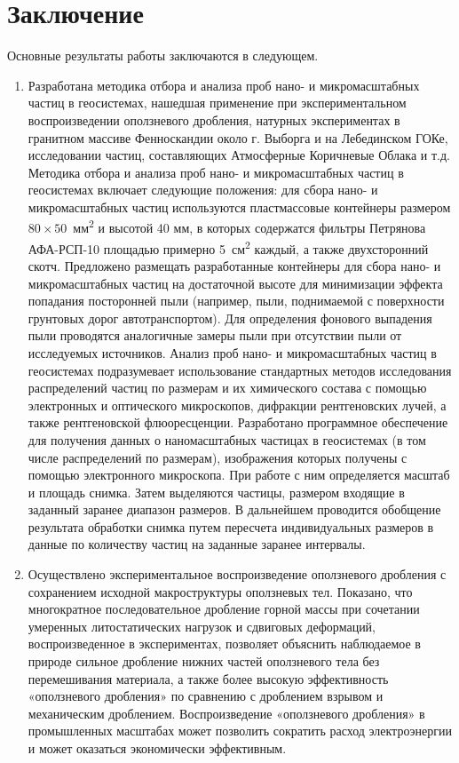 \chapter*{Заключение}						%

Основные результаты работы заключаются в следующем.
\begin{enumerate}
  \item Разработана методика отбора и анализа проб нано- и микромасштабных частиц в геосистемах, нашедшая применение при экспериментальном воспроизведении оползневого дробления,  натурных экспериментах в гранитном массиве Фенноскандии около г. Выборга и на Лебединском ГОКе, исследовании частиц, составляющих Атмосферные Коричневые Облака и т.д. Методика отбора и анализа проб нано- и микромасштабных частиц в геосистемах включает следующие положения: для сбора нано- и микромасштабных частиц  используются пластмассовые контейнеры размером $80\times50$~мм\textsuperscript{2} и высотой 40 мм, в которых содержатся фильтры Петрянова АФА-РСП-10 площадью примерно 5~см\textsuperscript{2} каждый, а также двухсторонний скотч. Предложено размещать разработанные контейнеры для сбора нано- и микромасштабных частиц на достаточной высоте для минимизации эффекта попадания посторонней пыли (например, пыли, поднимаемой с поверхности грунтовых дорог автотранспортом). Для определения фонового выпадения пыли проводятся аналогичные замеры пыли при отсутствии пыли от исследуемых источников. Анализ проб нано- и микромасштабных частиц в геосистемах подразумевает использование стандартных методов исследования распределений частиц по размерам и их химического состава с помощью электронных и оптического микроскопов, дифракции рентгеновских лучей, а также рентгеновской флюоресценции. Разработано программное обеспечение для получения данных о наномасштабных частицах в геосистемах (в том числе распределений по размерам), изображения которых получены с помощью электронного микроскопа. При работе с ним определяется масштаб и площадь снимка. Затем выделяются частицы, размером входящие в заданный заранее диапазон размеров. В дальнейшем проводится обобщение результата обработки снимка путем пересчета индивидуальных размеров в данные по количеству частиц на заданные заранее интервалы.
  \item Осуществлено экспериментальное воспроизведение оползневого дробления с сохранением исходной макроструктуры оползневых тел. Показано, что многократное последовательное дробление горной массы при сочетании умеренных литостатических нагрузок и сдвиговых деформаций, воспроизведенное в экспериментах, позволяет объяснить наблюдаемое в природе сильное дробление нижних частей оползневого тела без перемешивания материала, а также более высокую эффективность «оползневого дробления» по сравнению с дроблением взрывом и механическим дроблением. Воспроизведение «оползневого дробления» в промышленных масштабах может позволить сократить расход электроэнергии и может оказаться экономически эффективным. 

\end{enumerate}
